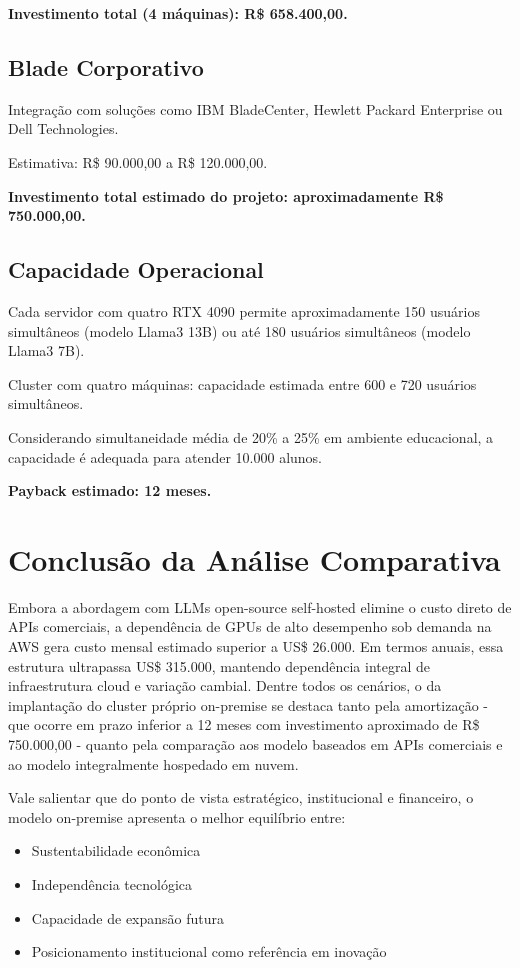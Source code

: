 \documentclass[12pt,a4paper,]{abntex2}
\begin{document}
\textbf{Investimento total (4 máquinas): R\$ 658.400,00.}

\subsection{Blade Corporativo}

Integração com soluções como IBM BladeCenter, Hewlett Packard Enterprise ou Dell Technologies.

Estimativa: R\$ 90.000,00 a R\$ 120.000,00.

\textbf{Investimento total estimado do projeto: aproximadamente R\$ 750.000,00.}

\subsection{Capacidade Operacional}

Cada servidor com quatro RTX 4090 permite aproximadamente 150 usuários simultâneos (modelo Llama3 13B) ou até 180 usuários simultâneos (modelo Llama3 7B).

Cluster com quatro máquinas: capacidade estimada entre 600 e 720 usuários simultâneos.

Considerando simultaneidade média de 20\% a 25\% em ambiente educacional, a capacidade é adequada para atender 10.000 alunos.

\textbf{Payback estimado: 12 meses.}


\section{Conclusão da Análise Comparativa}

Embora a abordagem com LLMs open-source self-hosted elimine o custo direto de APIs comerciais, a dependência de GPUs de alto desempenho sob demanda na AWS gera custo mensal estimado superior a US\$ 26.000.
Em termos anuais, essa estrutura ultrapassa US\$ 315.000, mantendo dependência integral de infraestrutura cloud e variação cambial.
Dentre todos os cenários, o da implantação do cluster próprio on-premise se destaca tanto pela amortização - que ocorre em prazo inferior a 12 meses com investimento aproximado de R\$ 750.000,00 - quanto pela comparação aos modelo baseados em APIs comerciais e ao modelo integralmente hospedado em nuvem.

Vale salientar que do ponto de vista estratégico, institucional e financeiro, o modelo on-premise apresenta o melhor equilíbrio entre:

\begin{itemize}
\item Sustentabilidade econômica
\item Independência tecnológica
\item Capacidade de expansão futura
\item Posicionamento institucional como referência em inovação
\end{itemize}
\end{document}
